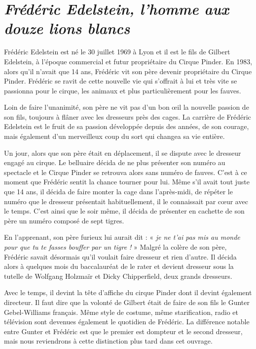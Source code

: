 \section*{\textit{Frédéric Edelstein, l’homme aux douze lions blancs}}
{}
\noindent
Frédéric Edelstein est né le 30 juillet 1969 à Lyon et il est le fils de Gilbert Edelstein, à l’époque commercial et futur propriétaire du Cirque Pinder. En 1983, alors qu’il n’avait que 14 ans, Frédéric vit son père devenir propriétaire du Cirque Pinder. Frédéric se ravit de cette nouvelle vie qui s’offrait à lui et très vite se passionna pour le cirque, les animaux et plus particulièrement pour les fauves.

Loin de faire l’unanimité, son père ne vit pas d’un bon œil la nouvelle passion de son fils, toujours à flâner avec les dresseurs près des cages. La carrière de Frédéric Edelstein est le fruit de sa passion développée depuis des années, de son courage, mais également d'un merveilleux coup du sort qui changea sa vie entière.

Un jour, alors que son père était en déplacement, il se dispute avec le dresseur engagé au cirque. Le belluaire décida de ne plus présenter son numéro au spectacle et le Cirque Pinder se retrouva alors sans numéro de fauves. C’est à ce moment que Frédéric sentit la chance tourner pour lui. Même s'il avait tout juste que 14 ans, il décida de faire monter la cage dans l’après-midi, de répéter le numéro que le dresseur présentait habituellement, il le connaissait par cœur avec le temps. C’est ainsi que le soir même, il décida de présenter en cachette de son père un numéro composé de sept tigres.

En l’apprenant, son père furieux lui aurait dit : « \textit{je ne t’ai pas mis au monde pour que tu te fasses bouffer par un tigre !} » Malgré la colère de son père, Frédéric savait désormais qu’il voulait faire dresseur et rien d’autre. Il décida alors à quelques mois du baccalauréat de le rater et devient dresseur sous la tutelle de Wolfgang Holzmaïr et Dicky Chipperfield, deux grands dresseurs.

Avec le temps, il devint la tête d’affiche du cirque Pinder dont il devint également directeur. Il faut dire que la volonté de Gilbert était de faire de son fils le Gunter Gebel-Williams français. Même style de costume, même starification, radio et télévision sont devenues également le quotidien de Frédéric. La différence notable entre Gunter et Frédéric est que le premier est dompteur et le second dresseur, mais nous reviendrons à cette distinction plus tard dans cet ouvrage.

